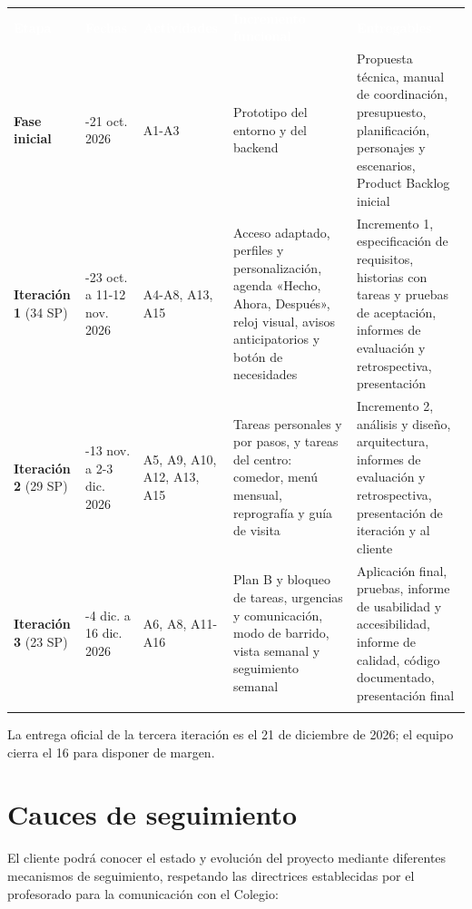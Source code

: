 \documentclass[11pt,a4paper]{article}
\newcommand{\hl}[1]{\textcolor{gblue}{\textbf{#1}}}
\begin{document}
\par\noindent\begin{tabular}{@{}>{\raggedright\arraybackslash}p{}>{\raggedright\arraybackslash}p{}>{\raggedright\arraybackslash}p{}>{\raggedright\arraybackslash}p{}>{\raggedright\arraybackslash}p{}@{}}
\rowcolor{gblue}\textcolor{white}{\textbf{Etapa}} & \textcolor{white}{\textbf{Fechas}} & \textcolor{white}{\textbf{Actividades}} & \textcolor{white}{\textbf{Incremento funcional}} & \textcolor{white}{\textbf{Entregables}} \\
\hl{Fase inicial} & 1-21 oct. 2026 & A1-A3 & Prototipo del entorno y del backend & Propuesta técnica, manual de coordinación, presupuesto, planificación, personajes y escenarios, Product Backlog inicial \\ \arrayrulecolor{gline}\hline
\rowcolor{glight}
\hl{Iteración 1} (34 SP) & 22-23 oct. a 11-12 nov. 2026 & A4-A8, A13, A15 & Acceso adaptado, perfiles y personalización, agenda «Hecho, Ahora, Después», reloj visual, avisos anticipatorios y botón de necesidades & Incremento 1, especificación de requisitos, historias con tareas y pruebas de aceptación, informes de evaluación y retrospectiva, presentación \\ \arrayrulecolor{gline}\hline
\hl{Iteración 2} (29 SP) & 12-13 nov. a 2-3 dic. 2026 & A5, A9, A10, A12, A13, A15 & Tareas personales y por pasos, y tareas del centro: comedor, menú mensual, reprografía y guía de visita & Incremento 2, análisis y diseño, arquitectura, informes de evaluación y retrospectiva, presentación de iteración y al cliente \\ \arrayrulecolor{gline}\hline
\rowcolor{glight}
\hl{Iteración 3} (23 SP) & 3-4 dic. a 16 dic. 2026 & A6, A8, A11-A16 & Plan B y bloqueo de tareas, urgencias y comunicación, modo de barrido, vista semanal y seguimiento semanal & Aplicación final, pruebas, informe de usabilidad y accesibilidad, informe de calidad, código documentado, presentación final \\ \arrayrulecolor{gline}\hline
\end{tabular}\par\medskip
La entrega oficial de la tercera iteración es el 21 de diciembre de 2026; el equipo cierra el 16 para disponer de margen.

\section{Cauces de seguimiento}
El cliente podrá conocer el estado y evolución del proyecto mediante diferentes mecanismos de seguimiento, respetando las directrices establecidas por el profesorado para la comunicación con el Colegio:
\end{document}
